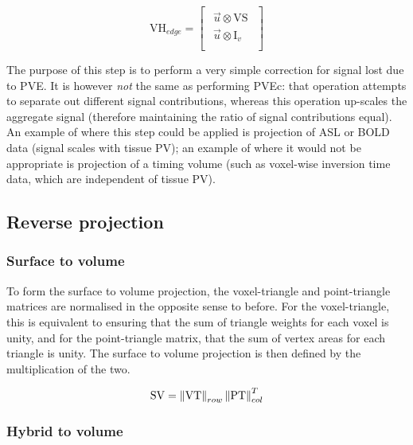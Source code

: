 \begin{equation}
\mathrm{VH}_{edge} =  \begin{bmatrix}
    \begin{array}{c}
  \vec{u} \otimes \mathrm{VS}  \\
  \hline
  \vec{u} \otimes \mathrm{I}_v \\
    \end{array}
  \end{bmatrix}
\end{equation}

The purpose of this step is to perform a very simple correction for signal lost due to PVE. It is however \textit{not} the same as performing PVEc: that operation attempts to separate out different signal contributions, whereas this operation up-scales the aggregate signal (therefore maintaining the ratio of signal contributions equal). An example of where this step could be applied is projection of ASL or BOLD data (signal scales with tissue PV); an example of where it would not be appropriate is projection of a timing volume (such as voxel-wise inversion time data, which are independent of tissue PV). 

\subsection{Reverse projection}

\subsubsection{Surface to volume}
To form the surface to volume projection, the voxel-triangle and point-triangle matrices are normalised in the opposite sense to before. For the voxel-triangle, this is equivalent to ensuring that the sum of triangle weights for each voxel is unity, and for the point-triangle matrix, that the sum of vertex areas for each triangle is unity. The surface to volume projection is then defined by the multiplication of the two.  

\begin{equation}
\mathrm{SV} =  \left\Vert \mathrm{VT} \right\Vert_{row} \left\Vert \mathrm{PT} \right\Vert_{col}^T
\end{equation}

\subsubsection{Hybrid to volume}

